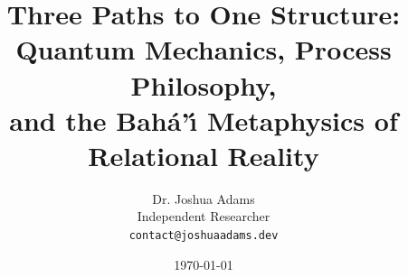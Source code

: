 \documentclass[12pt, a4paper]{article}
\newcommand{\bahai}{Bah\'a\textquoteright\'{\i}\xspace}
\begin{document}

\title{Three Paths to One Structure: Quantum Mechanics, Process Philosophy,\\
       and the \bahai Metaphysics of Relational Reality}

\author{Dr. Joshua Adams \\
        \small Independent Researcher\\
        \small \texttt{contact@joshuaadams.dev}}

\date{\today}

\maketitle

\begin{abstract}

\end{abstract}

\newpage
\tableofcontents
\newpage









\newpage


\end{document}
